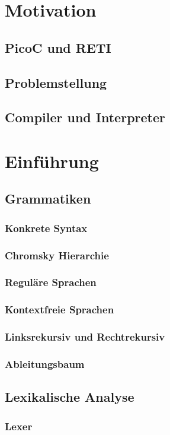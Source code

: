\documentclass{scrreprt}
\begin{document}
  \chapter{Motivation}
  \section{PicoC und RETI}
  \section{Problemstellung}
  \section{Compiler und Interpreter}
  \chapter{Einführung}
  \section{Grammatiken}
  \subsection{Konkrete Syntax}
  \subsection{Chromsky Hierarchie}
  \subsection{Reguläre Sprachen}
  \subsection{Kontextfreie Sprachen}
  \subsection{Linksrekursiv und Rechtrekursiv}
  \subsection{Ableitungsbaum}
  \section{Lexikalische Analyse}
  \subsection{Lexer}
\end{document}
